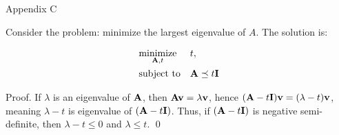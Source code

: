 \documentclass{beamer}
\begin{document}
\begin{frame}{Appendix C}
	\begin{flushleft}
		
		Consider the problem: minimize the largest eigenvalue of $A$. The solution is:
		
		\begin{equation}
			\begin{aligned}
				& \underset{\mathbf{A}, t}{\text{minimize}}
				& & t, \\
				& \text{subject to}
				& & \mathbf{A} \preceq t\mathbf{I}
			\end{aligned}
		\end{equation}
		
		Proof. If $\lambda$ is an eigenvalue of $\mathbf{A}$, then $\mathbf{A} \mathbf{v} = \lambda\mathbf{v}$, hence $(\mathbf{A} - t\mathbf{I}) \mathbf{v} = (\lambda - t)\mathbf{v}$, meaning $\lambda - t$ is eigenvalue of $(\mathbf{A} - t\mathbf{I})$. Thus, if $(\mathbf{A} - t\mathbf{I})$ is negative semi-definite, then $\lambda - t \leq 0$ and $\lambda \leq t$. \qed
		
		
	\end{flushleft}
\end{frame}
\end{document}
